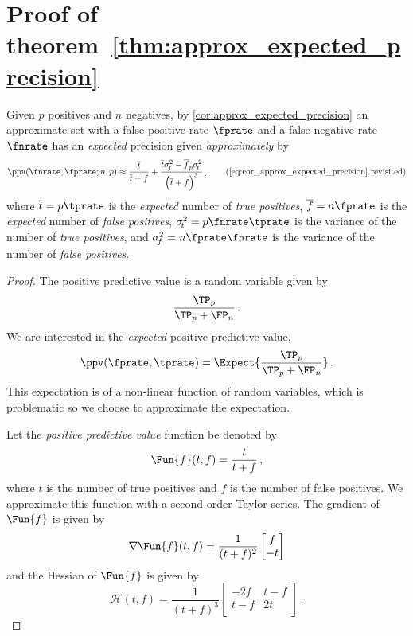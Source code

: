 \documentclass[ ../main.tex]{subfiles}
\begin{document}
{\section{Proof of theorem~\ref{thm:approx_expected_precision}}
\label{sec:proof_approx_expected_precision}
Given $p$ positives and $n$ negatives, by \cref{cor:approx_expected_precision} an approximate set with a false positive rate $\fprate$ and a false negative rate $\fnrate$ has an \emph{expected} precision given \emph{approximately} by
\begin{equation*}
    \ppv(\fnrate, \fprate ; n, p) \approx \frac{\overline{t}}{\overline{t} + \overline{f}} +
    \frac{\overline{t} \sigma_{\!f}^2 - \overline{f}_p \sigma_{\!t}^2}{\left(\overline{t} + \overline{f}\right)^3}\,,
    \tag{\ref{eq:cor_approx_expected_precision} revisited}
\end{equation*}
where $\overline{t} = p \tprate$ is the \emph{expected} number of \emph{true positives}, $\overline{f} =  n \fprate$ is the \emph{expected} number of \emph{false positives}, $\sigma_{\!t}^2 = p \fnrate \tprate$ is the variance of the number of \emph{true positives}, and $\sigma_{\!f}^2 = n \fprate \fnrate$ is the variance of the number of \emph{false positives}.
\begin{proof}
The positive predictive value is a random variable given by
\begin{equation}
    \frac{\TP_p}{\TP_p + \FP_n}\,.
\end{equation}
We are interested in the \emph{expected} positive predictive value,
\begin{equation}
    \ppv(\fprate,\tprate) = \Expect{\frac{\TP_p}{\TP_p + \FP_n}}\,.
\end{equation}
This expectation is of a non-linear function of random variables, which is problematic so we choose to approximate the expectation.

Let the \emph{positive predictive value} function be denoted by
\begin{equation}
    \Fun{f}(t, f) = \frac{t}{t + f}\,,
\end{equation}
where $t$ is the number of true positives and $f$ is the number of false positives.
We approximate this function with a second-order Taylor series.
The gradient of $\Fun{f}$ is given by
\begin{equation}
    \nabla{\Fun{f}}(t,f) =
    \frac{1}{(t + f)^2}
    \begin{bmatrix}
        f\\
        -t\\
    \end{bmatrix}
\end{equation}
and the Hessian of $\Fun{f}$ is given by
\begin{equation}
    \mathcal{H}(t,f) =
    \frac{1}{(t + f)^3}
    \begin{bmatrix}
        -2 f & t-f\\
        t-f & 2 t \\
    \end{bmatrix}\,.
\end{equation}


\end{proof}}
\end{document}
